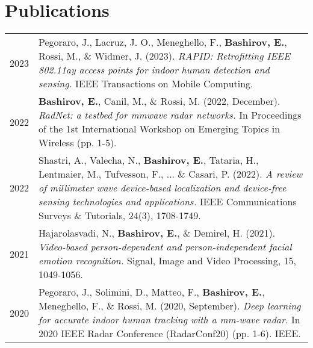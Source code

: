 \documentclass[lighthipster]{simplehipstercv}
\newlength{\rightcolwidth}
\begin{document}
\begin{paracol}{2}
\vfill %
\eject


\end{paracol}

\clearpage

\section*{Publications}
\begin{tabular}{l | >{\footnotesize}p{}}

    2023 & Pegoraro, J., Lacruz, J. O., Meneghello, F., \textbf{Bashirov, E.}, Rossi, M., \& Widmer, J. (2023). \emph{RAPID: Retrofitting IEEE 802.11ay access points for indoor human detection and sensing.} IEEE Transactions on Mobile Computing. \\
    
    2022 & \textbf{Bashirov, E.}, Canil, M., \& Rossi, M. (2022, December). \emph{RadNet: a testbed for mmwave radar networks.} In Proceedings of the 1st International Workshop on Emerging Topics in Wireless (pp. 1-5). \\
    
    2022 & Shastri, A., Valecha, N., \textbf{Bashirov, E.}, Tataria, H., Lentmaier, M., Tufvesson, F., ... \& Casari, P. (2022). \emph{A review of millimeter wave device-based localization and device-free sensing technologies and applications.} IEEE Communications Surveys \& Tutorials, 24(3), 1708-1749. \\
    
    2021 & Hajarolasvadi, N., \textbf{Bashirov, E.}, \& Demirel, H. (2021). \emph{Video-based person-dependent and person-independent facial emotion recognition.} Signal, Image and Video Processing, 15, 1049-1056. \\

    2020 & Pegoraro, J., Solimini, D., Matteo, F., \textbf{Bashirov, E.}, Meneghello, F., \& Rossi, M. (2020, September). \emph{Deep learning for accurate indoor human tracking with a mm-wave radar.} In 2020 IEEE Radar Conference (RadarConf20) (pp. 1-6). IEEE. \\

\end{tabular}
\end{document}
